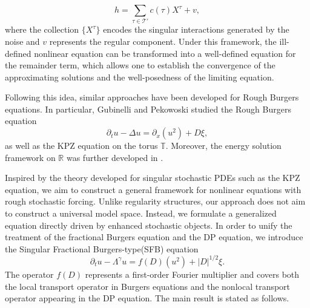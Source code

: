 \documentclass{article}
\numberwithin{equation}{section}
\newcommand{\ml}{\mathcal}
\begin{document}
\[
h=\sum_{\tau\in\ml T'}c(\tau)X^\tau+v,
\]
where the collection $\{X^\tau\}$ encodes the singular interactions generated by the noise and $v$ represents the regular component. Under this framework, the ill-defined nonlinear equation can be transformed into a well-defined equation for the remainder term, which allows one to establish the convergence of the approximating solutions and the well-posedness of the limiting equation.
\par Following this idea, similar approaches have been developed for Rough Burgers equations. In particular, Gubinelli and Pekowoski \cite{gubinelli2017kpz} studied the Rough Burgers equation
\begin{equation}
    \partial_t u-\Delta u=\partial_x(u^2)+D\xi,
\end{equation}
as well as the KPZ equation on the torus $\mathbb T$. Moreover, the energy solution framework on $\mathbb R$ was further developed in \cite{gubinelli2018energy}.
\par Inspired by the theory developed for singular stochastic PDEs such as the KPZ equation, we aim to construct a general framework for nonlinear equations with rough stochastic forcing. Unlike regularity structures, our approach does not aim to construct a universal model space. Instead, we formulate a generalized equation directly driven by enhanced stochastic objects. In order to unify the treatment of the fractional Burgers equation and the DP equation, we introduce the Singular Fractional Burgers-type(SFB) equation
\begin{equation}\label{eq;generalized Burgers-type}
    \partial_t u-\Lambda^\gamma u=f(D)(u^2)+|D|^{1/2}\xi .
\end{equation}
The operator $f(D)$ represents a first-order Fourier multiplier and covers both the local transport operator in Burgers equations and the nonlocal transport operator appearing in the DP equation. The main result is stated as follows.
\end{document}
